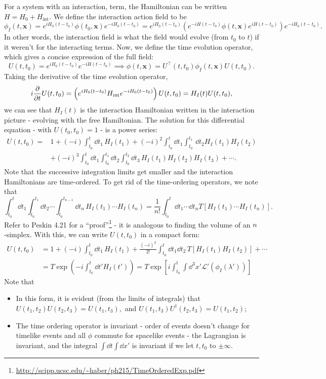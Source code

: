 \documentclass{article}
\begin{document}
For a system with an interaction, term, the Hamiltonian can be written $H=H_0+H_\text{int}$. We define the interaction action field to be 
$$\phi_I(t,\mathbf x)=e^{iH_0(t-t_0)}\phi(t_0,\mathbf x)e^{-iH_0(t-t_0)}=e^{iH_0(t-t_0)}\left(e^{-iH(t-t_0)}\phi(t,\mathbf x)e^{iH(t-t_0)}\right)e^{-iH_0(t-t_0)}.$$
In other words, the interaction field is what the field would evolve (from $t_0$ to $t$) if it weren't for the interacting terms. Now, we define the time evolution operator, which gives a concise expression of the full field:
$$U(t,t_0)=e^{iH_0(t-t_0)}e^{-iH(t-t_0)}\implies \phi(t,\mathbf x)=U^\intercal(t,t_0)\phi_I(t,\mathbf x)U(t,t_0).$$
Taking the derivative of the time evolution operator, 
$$i \frac{\partial }{\partial t}U(t,t_0)=\left(e^{iH_0(t-t_0)}H_\text{int} e^{-iH_0(t-t_0)}\right)U(t,t_0)=H_I(t)U(t,t_0),$$
we can see that $H_I(t)$ is the interaction Hamiltonian written in the interaction picture - evolving with the free Hamiltonian. The solution for this differential equation - with $U(t_0,t_0)=1$ - is a power series:
\begin{align*}
    U(t,t_0)=&1+(-i)\int^t_{t_0}\dd t_1\,H_I(t_1)+(-i)^2\int^t_{t_0}\dd t_1\int^{t_1}_{t_0}\,\dd t_2H_I(t_1)H_I(t_2)\\
    &+(-i)^3\int^t_{t_0}\dd t_1\int^{t_1}_{t_0}\dd t_2\int^{t_2}_{t_0}\dd t_3\,H_I(t_1)H_I(t_2)H_I(t_3)+\cdots.
\end{align*}
Note that the successive integration limits get smaller and the interaction Hamiltonians are time-ordered. To get rid of the time-ordering operators, we note that 
$$\int^t_{t_0}\dd t_1\int^{t_1}_{t_0}\dd t_2\cdots\int^{t_{n-1}}_{t_0}\dd t_n\,H_I(t_1)\cdots H_I(t_n)=\frac 1{n!}\int^t_{t_0}\dd t_1\cdots\dd t_n T\left[H_I(t_1)\cdots H_I(t_n)\right].$$
Refer to Peskin 4.21 for a ``proof''\footnote{\url{http://scipp.ucsc.edu/~haber/ph215/TimeOrderedExp.pdf}} - it is analogous to finding the volume of an $n$-simplex. With this, we can write $U(t,t_0)$ in a compact form:
\begin{align*}
    U(t,t_0)&=1+(-i)\int^t_{t_0}\dd t_1\,H_I(t_1)+\frac{(-i)^2}{2!}\int^t_{t_0}\dd t_1\dd t_2\,T[H_I(t_1)H_I(t_2)]+\cdots\\
    &=T\exp\left(-i\int^t_{t_0}\dd t'H_I(t')\right)=T\exp\left[i\int^t_{t_0}\int\dd^3x'\mathcal L'(\phi_I(\lambda'))\right]
\end{align*}
Note that 
\begin{itemize}
    \item In this form, it is evident (from the limits of integrals) that $U(t_1,t_2)U(t_2,t_3)=U(t_1,t_3),$ and $U(t_1,t_3)U^\dag(t_2,t_3)=U(t_1,t_2);$
    \item The time ordering operator is invariant - order of events doesn't change for timelike events and all $\phi$ commute for spacelike events - the Lagrangian is invariant, and the integral $\int\dd t\int\dd x'$ is invariant if we let $t,t_0$ to $\pm\infty$.
\end{itemize}
\end{document}
